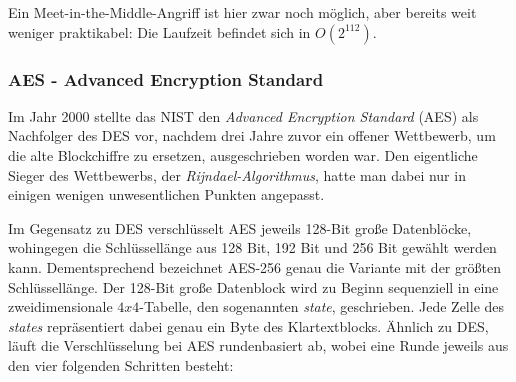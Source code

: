 Ein Meet-in-the-Middle-Angriff ist hier zwar noch möglich, aber bereits weit weniger praktikabel: Die Laufzeit befindet sich in $O(2^{112})$.

\subsubsection{AES - Advanced Encryption Standard}


Im Jahr 2000 stellte das NIST den \textit{Advanced Encryption Standard} (AES) als Nachfolger des DES vor, nachdem drei Jahre zuvor ein offener Wettbewerb, um die alte Blockchiffre zu ersetzen, ausgeschrieben worden war.
Den eigentliche Sieger des Wettbewerbs, der \textit{Rijndael-Algorithmus}, hatte man dabei nur in einigen wenigen unwesentlichen Punkten angepasst.

Im Gegensatz zu DES verschlüsselt AES jeweils 128-Bit große Datenblöcke, wohingegen die Schlüssellänge aus 128 Bit, 192 Bit und 256 Bit gewählt werden kann. Dementsprechend bezeichnet AES-256 genau die Variante mit der größten Schlüssellänge. Der 128-Bit große Datenblock wird zu Beginn sequenziell in eine zweidimensionale $4x4$-Tabelle, den sogenannten \textit{state}, geschrieben. Jede Zelle des \textit{states} repräsentiert dabei genau ein Byte des Klartextblocks. Ähnlich zu DES, läuft die Verschlüsselung bei AES rundenbasiert ab, wobei eine Runde jeweils aus den vier folgenden Schritten besteht:

